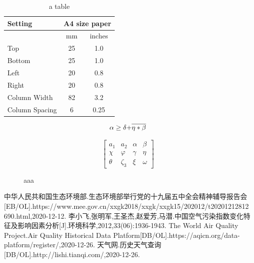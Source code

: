\documentclass[UTF8,a4paper,10pt]{article}
\begin{document}
\vspace{3ex}
\begin{table}[h]
    \centering
    \begin{tabular}{|l|c|c|}\hline
        Setting&\multicolumn{2}{c|}{A4 size paper}\\\hline
        &mm&inches\\
        Top&25&1.0\\
        Bottom&25&1.0\\
        Left&20&0.8\\
        Right&20&0.8\\
        Column Width&82&3.2\\
        Column Spacing&6&0.25\\\hline
    \end{tabular}
    \caption{a table}
    \label{tab:table1}
\end{table}
\vspace{3ex}

\begin{figure}[h]
\begin{minipage}[h]{0.48\linewidth}
\[\alpha  \ge \delta {\rm{ + }}\overline {\eta  * \beta } \]
\end{minipage}
\begin{minipage}[h]{0.48\linewidth}
\[\left[ {\begin{array}{*{20}{c}}
{{a_1}}&{{a_2}}&\alpha &\beta \\
\chi &\varphi &\gamma &\eta \\
\theta &{{\zeta _3}}&\xi &\omega
\end{array}} \right]\]
\end{minipage}
\vspace{3ex}
\caption{aaa}
\end {figure}

\small
\begin{thebibliography}{99}
    \setlength{\parskip}{0pt}  %
     中华人民共和国生态环境部.生态环境部举行党的十九届五中全会精神辅导报告会[EB/OL].https://www.mee.gov.cn/xxgk2018/xxgk/xxgk15/202012/t20201212812690.html,2020-12-12.
     李小飞,张明军,王圣杰,赵爱芳,马潜.中国空气污染指数变化特征及影响因素分析[J].环境科学,2012,33(06):1936-1943.
     The World Air Quality Project.Air Quality Historical Data Platform[DB/OL].https://aqicn.org/data-platform/register/,2020-12-26.
     天气网.历史天气查询[DB/OL].http://lishi.tianqi.com/,2020-12-26.
    
\end{thebibliography}
\end{document}
